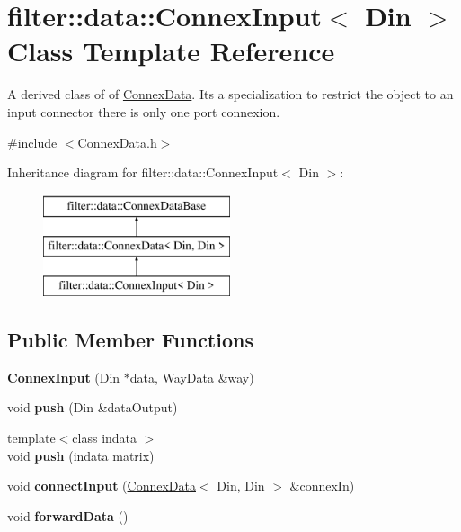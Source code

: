 \hypertarget{classfilter_1_1data_1_1_connex_input}{}\section{filter\+:\+:data\+:\+:Connex\+Input$<$ Din $>$ Class Template Reference}
\label{classfilter_1_1data_1_1_connex_input}


A derived class of of \hyperlink{classfilter_1_1data_1_1_connex_data}{Connex\+Data}. It\textquotesingle{}s a specialization to restrict the object to an input connector there is only one port connexion.  




{\ttfamily \#include $<$Connex\+Data.\+h$>$}

Inheritance diagram for filter\+:\+:data\+:\+:Connex\+Input$<$ Din $>$\+:\begin{figure}[H]
\begin{center}
\leavevmode
\includegraphics[height=3.000000cm]{df/ddc/classfilter_1_1data_1_1_connex_input}
\end{center}
\end{figure}
\subsection*{Public Member Functions}
\begin{DoxyCompactItemize}
\item 
\mbox{\label{classfilter_1_1data_1_1_connex_input_a5c7e7ee73508eab04151a486ca86d32a}} 
{\bfseries Connex\+Input} (Din $\ast$data, Way\+Data \&way)
\item 
\mbox{\label{classfilter_1_1data_1_1_connex_input_a17efe16aab1f8715975e56f99212841a}} 
void {\bfseries push} (Din \&data\+Output)
\item 
\mbox{\label{classfilter_1_1data_1_1_connex_input_a2ed43bbc4b698728aab5feef012b922d}} 
{\footnotesize template$<$class indata $>$ }\\void {\bfseries push} (indata matrix)
\item 
\mbox{\label{classfilter_1_1data_1_1_connex_input_aa0851447c5a5d7347fbdde287e8f6db1}} 
void {\bfseries connect\+Input} (\hyperlink{classfilter_1_1data_1_1_connex_data}{Connex\+Data}$<$ Din, Din $>$ \&connex\+In)
\item 
\mbox{\label{classfilter_1_1data_1_1_connex_input_ad2973cd9259580e910a3369525ab896b}} 
void {\bfseries forward\+Data} ()
\end{DoxyCompactItemize}
